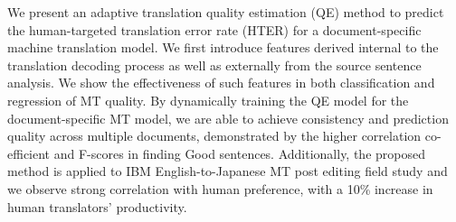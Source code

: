 We present an adaptive translation quality estimation (QE) method to predict the human-targeted translation error rate (HTER) for a document-specific machine translation model. We first introduce features derived internal to the translation decoding process as well as externally from the source sentence analysis. We show the effectiveness of such features in both classification and regression of MT quality. By dynamically training the QE model for the document-specific MT model, we are able to achieve consistency and prediction quality across multiple documents, demonstrated by the higher correlation co- efficient and F-scores in finding Good sentences. Additionally, the proposed method is applied to IBM English-to-Japanese MT post editing field study and we observe strong correlation with human preference, with a 10\% increase in human translators' productivity.
